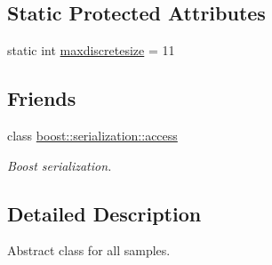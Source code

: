 \subsection*{Static Protected Attributes}
\begin{DoxyCompactItemize}
\item 
static int \hyperlink{class_c_sample_a8373612b7c5eb96d0a0d86bb677f79df}{maxdiscretesize} = 11
\end{DoxyCompactItemize}
\subsection*{Friends}
\begin{DoxyCompactItemize}
\item 
class \hyperlink{class_c_sample_ac98d07dd8f7b70e16ccb9a01abf56b9c}{boost\-::serialization\-::access}
\begin{DoxyCompactList}\small\item\em Boost serialization. \end{DoxyCompactList}\end{DoxyCompactItemize}


\subsection{Detailed Description}
Abstract class for all samples. 

